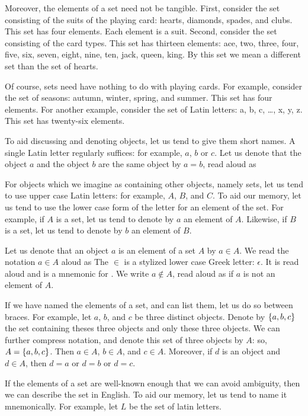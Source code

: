 Moreover, the
elements of a set
need not be tangible.
First, consider the set
consisting of the suits of
the playing card:
hearts, diamonds, spades, and clubs.
This set has four elements.
Each element is a suit.
Second, consider the set
consisting of the card types.
This set has thirteen elements:
ace, two, three, four, five,
six, seven, eight, nine, ten,
jack, queen, king.
By this set we mean a different
set than the set
of hearts.

Of course, sets need have nothing to
do with playing cards.
For example, consider the set of
seasons: autumn, winter, spring,
and summer.
This set has four elements.
For another example,
consider the set of Latin letters:
a, b, c, \dots, x, y, z.
This set has twenty-six elements.


To aid discussing and
denoting objects, let
us tend to give them
short names.
A single Latin
letter regularly suffices:
for example,
$a$, $b$ or $c$.
Let us denote that
the object $a$ and
the object $b$ are
the same object
by $a = b$,
read aloud as

For objects which
we imagine as containing
other objects, namely sets,
let us tend to use
upper case Latin letters:
for example,
$A$, $B$, and $C$.
To aid our memory,
let us tend to use the lower
case form of the letter for
an element of the set.
For example,
if $A$ is a set,
let us tend to denote by
$a$ an element of $A$.
Likewise, if $B$ is a set,
let us tend to denote
by $b$ an element of $B$.


Let us denote that
an object $a$
is an element of a set $A$
by $a \in A$.
We read the notation
$a \in A$ aloud as 
The $\in$ is a stylized
lower case Greek letter: $\epsilon$.
It is
read aloud  and
is a mnemonic for .
We write $a \not\in A$, read aloud
as  if $a$ is not
an element of $A$.

If we have named
the elements of a set,
and can list them,
let us do so between braces.
For example,
let $a$, $b$, and $c$
be three distinct objects.
Denote by $\{a, b, c\}$
the set containing theses
three objects and only these
three objects.
We can further compress notation,
and denote this set of
three objects by $A$:
so, $A = \{a, b, c\}$.
Then $a \in A$,
$b \in A$, and $c \in A$.
Moreover, if $d$
is an object and
$d \in A$, then $d = a$
or $d = b$ or $d = c$.

If the elements of a set are
well-known enough that we can
avoid ambiguity, then we can
describe the set in English.
To aid our memory,
let us tend to name it mnemonically.
For example,
let $L$ be the set of latin letters.

